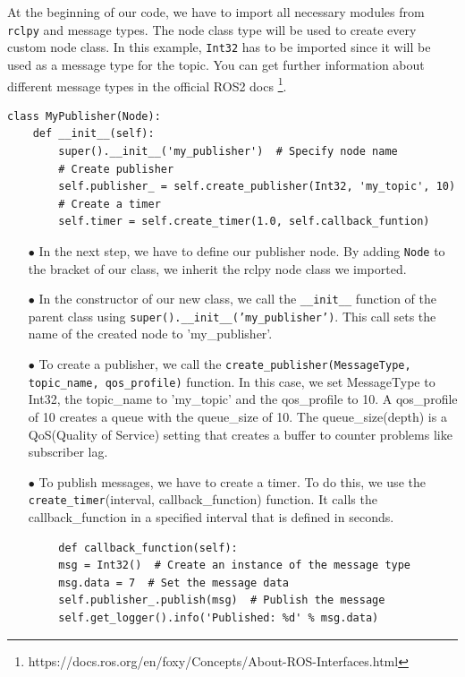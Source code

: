 \documentclass{article}
\begin{document}
\noindent
At the beginning of our code, we have to import all necessary modules from \texttt{rclpy} and message types. The node class type will be used to create every custom node class. In this example, \texttt{Int32} has to be imported since it will be used as a message type for the topic. You can get further information about different message types in the official ROS2 docs \footnote{https://docs.ros.org/en/foxy/Concepts/About-ROS-Interfaces.html}.

    
\begin{verbatim}
class MyPublisher(Node):
    def __init__(self):
        super().__init__('my_publisher')  # Specify node name
        # Create publisher
        self.publisher_ = self.create_publisher(Int32, 'my_topic', 10) 
        # Create a timer
        self.timer = self.create_timer(1.0, self.callback_funtion)  
\end{verbatim}

\begin{enumerate}

\item[$\bullet$] In the next step, we have to define our publisher node. By adding \texttt{Node} to the bracket of our class, we inherit the rclpy node class we imported.

\item[$\bullet$] In the constructor of our new class, we call the \texttt{\_\_init\_\_} function of the parent class using \texttt{super().\_\_init\_\_('my\_publisher')}. This call sets the name of the created node to 'my\_publisher'.

\item[$\bullet$] To create a publisher, we call the \texttt{create\_publisher(MessageType, topic\_name, qos\_profile)} function. In this case, we set MessageType to Int32, the topic\_name to 'my\_topic' and the qos\_profile to 10. A qos\_profile of 10 creates a queue with the queue\_size of 10. The queue\_size(depth) is a QoS(Quality of Service) setting that creates a buffer to counter problems like subscriber lag.

\item[$\bullet$]To publish messages, we have to create a timer. To do this, we use the \texttt{create\_timer}(interval, callback\_function) function. It calls the callback\_function in a specified interval that is defined in seconds.
\end{enumerate}

\begin{verbatim}
        def callback_function(self):
        msg = Int32()  # Create an instance of the message type
        msg.data = 7  # Set the message data
        self.publisher_.publish(msg)  # Publish the message
        self.get_logger().info('Published: %d' % msg.data) 
    \end{verbatim}
\end{document}
